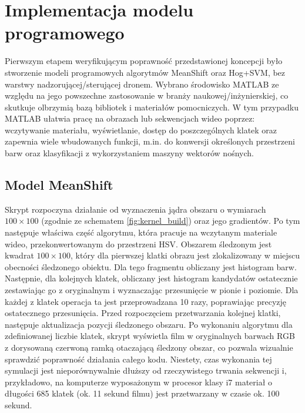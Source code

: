 \chapter{Implementacja modelu programowego}

Pierwszym etapem weryfikującym poprawność przedstawionej koncepcji było stworzenie modeli programowych algorytmów MeanShift oraz Hog+SVM, bez warstwy nadzorującej/sterującej dronem. 
Wybrano środowisko MATLAB ze względu na jego powszechne zastosowanie w branży naukowej/inżynierskiej, co skutkuje olbrzymią bazą bibliotek i materiałów pomocniczych. 
W tym przypadku MATLAB ułatwia pracę na obrazach lub sekwencjach wideo poprzez: wczytywanie materiału, wyświetlanie, dostęp do poszczególnych klatek oraz zapewnia wiele wbudowanych funkcji, m.in. do konwersji określonych przestrzeni barw oraz klasyfikacji z wykorzystaniem maszyny wektorów nośnych. %

\section{Model MeanShift}

Skrypt rozpoczyna działanie od wyznaczenia jądra obszaru o wymiarach $100 \times 100$ (zgodnie ze schematem \ref{fig:kernel_build}) oraz jego gradientów. %
Po tym następuje właściwa część algorytmu, która pracuje na wczytanym materiale wideo, przekonwertowanym do przestrzeni HSV. 
Obszarem śledzonym jest kwadrat $100\times 100$, który dla pierwszej klatki obrazu jest zlokalizowany w miejscu obecności śledzonego obiektu. %
Dla tego fragmentu obliczany jest histogram barw. 
Następnie, dla kolejnych klatek, obliczany jest histogram kandydatów ostatecznie zestawiając go z oryginalnym i wyznaczając przesunięcie w pionie i poziomie. %
Dla każdej z klatek operacja ta jest przeprowadzana 10 razy, poprawiając precyzję ostatecznego przesunięcia. 
Przed rozpoczęciem przetwarzania kolejnej klatki, następuje aktualizacja pozycji śledzonego obszaru. %
Po wykonaniu algorytmu dla zdefiniowanej liczbie klatek, skrypt wyświetla film w oryginalnych barwach RGB z dorysowaną czerwoną ramką otaczającą śledzony obszar, co pozwala wizualnie sprawdzić poprawność działania całego kodu. 
Niestety, czas wykonania tej symulacji jest nieporównywalnie dłuższy od rzeczywistego trwania sekwencji i, przykładowo, na komputerze wyposażonym w procesor klasy i7 materiał o długości 685 klatek (ok. 11 sekund filmu) jest przetwarzany w czasie ok. 100 sekund.

